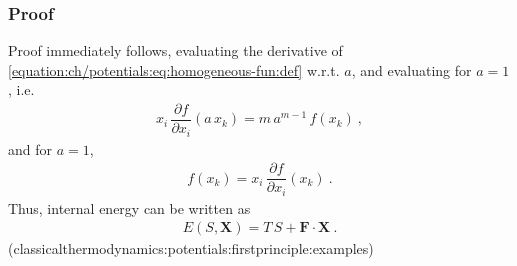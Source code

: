 \documentclass[letterpaper,10pt,english]{jupyterBook}
\begin{document}
\subsubsection*{Proof}

\sphinxAtStartPar
Proof immediately follows, evaluating the derivative of \eqref{equation:ch/potentials:eq:homogeneous-fun:def} w.r.t. \(a\), and evaluating for \(a = 1\), i.e.
\begin{equation*}
\begin{split}x_i \, \dfrac{\partial f}{\partial x_i} (a \, x_k) = m \, a^{m-1} \, f(x_k) \ ,\end{split}
\end{equation*}
\sphinxAtStartPar
and for \(a = 1\),
\begin{equation*}
\begin{split}f(x_k) = x_i \, \dfrac{\partial f}{\partial x_i} (x_k)\ .\end{split}
\end{equation*}
\sphinxAtStartPar
Thus, internal energy can be written as
\begin{equation*}
\begin{split}E(S, \mathbf{X}) = T \, S + \mathbf{F} \cdot \mathbf{X} \ .\end{split}
\end{equation*}
\sphinxAtStartPar
(classical\sphinxhyphen{}thermodynamics:potentials:first\sphinxhyphen{}principle:examples)
\end{document}
